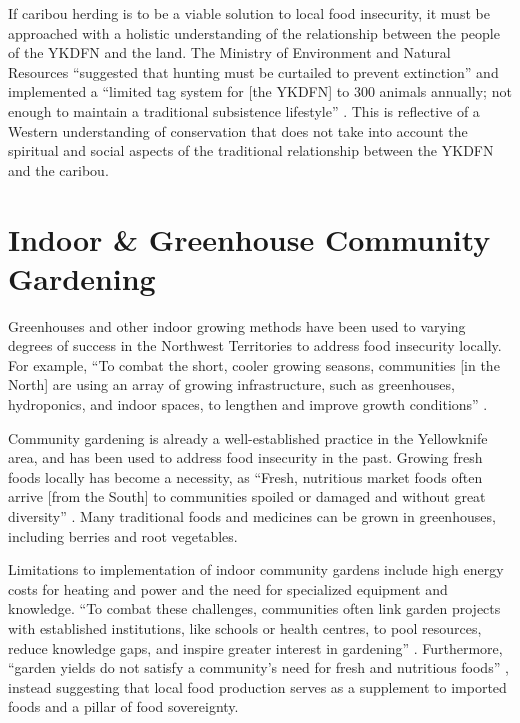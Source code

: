 \documentclass{report}
\begin{document}
\hspace{24pt} If caribou herding is to be a viable solution to local food insecurity, it must be approached with a holistic understanding of the relationship between the people of the YKDFN and the land. The Ministry of Environment and Natural Resources ``suggested that hunting must be curtailed to prevent extinction'' and implemented a ``limited tag system for [the YKDFN] to 300 animals annually; not enough to maintain a traditional subsistence lifestyle'' \parencite[230]{denefoodwaysontologies}. This is reflective of a Western understanding of conservation that does not take into account the spiritual and social aspects of the traditional relationship between the YKDFN and the caribou.

\section{Indoor \& Greenhouse Community Gardening}

\hspace{24pt} Greenhouses and other indoor growing methods have been used to varying degrees of success in the Northwest Territories to address food insecurity locally. For example, ``To combat the short, cooler growing seasons, communities [in the North] are using an array of growing infrastructure, such as greenhouses, hydroponics, and indoor spaces, to lengthen and improve growth conditions'' \parencite[90]{resilientcommunities}. 

\hspace{24pt} Community gardening is already a well-established practice in the Yellowknife area, and has been used to address food insecurity in the past. Growing fresh foods locally has become a necessity, as ``Fresh, nutritious market foods often arrive [from the South] to communities spoiled or damaged and without great diversity'' \parencite[85]{resilientcommunities}. Many traditional foods and medicines can be grown in greenhouses, including berries and root vegetables.

\hspace{24pt} Limitations to implementation of indoor community gardens include high energy costs for heating and power and the need for specialized equipment and knowledge. ``To combat these challenges, communities often link garden projects with established institutions, like schools or health centres, to pool resources, reduce knowledge gaps, and inspire greater interest in gardening'' \parencite[90]{resilientcommunities}. Furthermore, ``garden yields do not satisfy a community's need for fresh and nutritious foods'' \parencite[85]{resilientcommunities}, instead suggesting that local food production serves as a supplement to imported foods and a pillar of food sovereignty.
\end{document}
